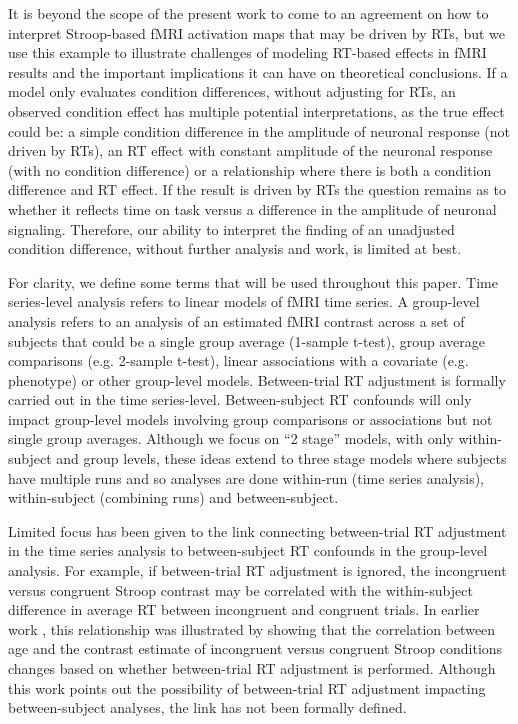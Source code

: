 \documentclass[titlepage,12pt] {article}
\begin{document}
It is beyond the scope of the present work to come to an agreement on how to interpret Stroop-based fMRI activation maps that may be driven by RTs, but we use this example to illustrate challenges of modeling RT-based effects in fMRI results and the important implications it can have on theoretical conclusions. If a model only evaluates condition differences, without adjusting for RTs, an observed condition effect has multiple potential interpretations, as the true effect could be: a simple condition difference in the amplitude of neuronal response (not driven by RTs), an RT effect with constant amplitude of the neuronal response (with no condition difference) or a relationship where there is both a condition difference and RT effect. If the result is driven by RTs the question remains as to whether it reflects time on task versus a difference in the amplitude of neuronal signaling. Therefore, our ability to interpret the finding of an unadjusted condition difference, without further analysis and work, is limited at best.

For clarity, we define some terms that will be used throughout this paper. Time series-level analysis refers to linear models of fMRI time series. A group-level analysis refers to an analysis of an estimated fMRI contrast across a set of subjects that could be a single group average (1-sample t-test), group average comparisons (e.g. 2-sample t-test), linear associations with a covariate (e.g. phenotype) or other group-level models.   Between-trial RT adjustment is formally carried out in the time series-level. Between-subject RT confounds will only impact group-level models involving group comparisons or associations but not single group averages.  Although we focus on ``2 stage'' models, with only within-subject and group levels, these ideas extend to three stage models where subjects have multiple runs and so analyses are done within-run (time series analysis), within-subject (combining runs) and between-subject.


Limited focus has been given to the link connecting between-trial RT adjustment in the time series analysis to between-subject RT confounds in the group-level analysis. For example, if between-trial RT adjustment is ignored, the incongruent versus congruent Stroop contrast may be  correlated with the within-subject difference in average RT between incongruent and congruent trials.  In earlier work \citep{carpRemovingEffectResponse2012}, this relationship was illustrated by showing that the correlation between age and the contrast estimate of incongruent versus congruent Stroop conditions changes based on whether between-trial RT adjustment is performed. Although this work points out the possibility of between-trial RT adjustment impacting between-subject analyses, the link has not been formally defined.
 
\end{document}
